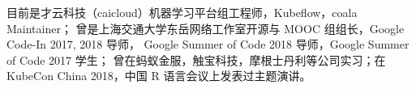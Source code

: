 

\begin{cvparagraph}
\begin{minipage}[t]{\textwidth}
目前是才云科技（caicloud）机器学习平台组工程师，Kubeflow，coala Maintainer；
曾是上海交通大学东岳网络工作室开源与 MOOC 组组长，Google Code-In 2017, 2018 导师，
Google Summer of Code 2018 导师，Google Summer of Code 2017 学生；
曾在蚂蚁金服，触宝科技，摩根士丹利等公司实习；在 KubeCon China 2018，中国 R 语言会议上发表过主题演讲。
\end{minipage}
\end{cvparagraph}
